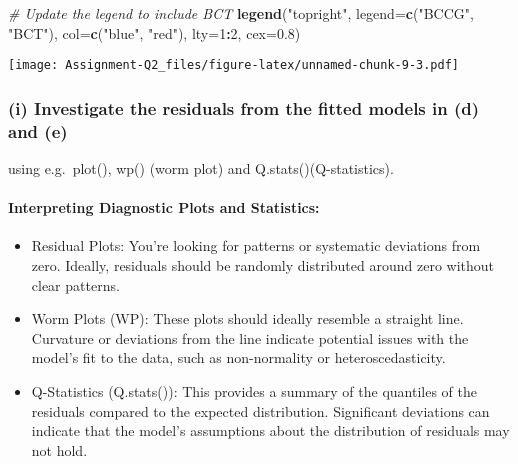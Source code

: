 \documentclass[
]{article}
\newenvironment{Shaded}{\begin{snugshade}}{\end{snugshade}}
\newcommand{\AttributeTok}[1]{\textcolor[rgb]{0.13,0.29,0.53}{#1}}
\newcommand{\CommentTok}[1]{\textcolor[rgb]{0.56,0.35,0.01}{\textit{#1}}}
\newcommand{\DecValTok}[1]{\textcolor[rgb]{0.00,0.00,0.81}{#1}}
\newcommand{\FloatTok}[1]{\textcolor[rgb]{0.00,0.00,0.81}{#1}}
\newcommand{\FunctionTok}[1]{\textcolor[rgb]{0.13,0.29,0.53}{\textbf{#1}}}
\newcommand{\NormalTok}[1]{#1}
\newcommand{\SpecialCharTok}[1]{\textcolor[rgb]{0.81,0.36,0.00}{\textbf{#1}}}
\newcommand{\StringTok}[1]{\textcolor[rgb]{0.31,0.60,0.02}{#1}}
\begin{document}
\begin{Shaded}
\begin{Highlighting}[]
\CommentTok{\# Update the legend to include BCT}
\FunctionTok{legend}\NormalTok{(}\StringTok{"topright"}\NormalTok{, }\AttributeTok{legend=}\FunctionTok{c}\NormalTok{(}\StringTok{"BCCG"}\NormalTok{, }\StringTok{"BCT"}\NormalTok{), }\AttributeTok{col=}\FunctionTok{c}\NormalTok{(}\StringTok{"blue"}\NormalTok{, }\StringTok{"red"}\NormalTok{), }\AttributeTok{lty=}\DecValTok{1}\SpecialCharTok{:}\DecValTok{2}\NormalTok{, }\AttributeTok{cex=}\FloatTok{0.8}\NormalTok{)}
\end{Highlighting}
\end{Shaded}

\texttt{[image: Assignment-Q2\_files/figure-latex/unnamed-chunk-9-3.pdf]}

\hypertarget{i-investigate-the-residuals-from-the-fitted-models-in-d-and-e}{%
\subsubsection{(i) Investigate the residuals from the fitted models in
(d) and
(e)}\label{i-investigate-the-residuals-from-the-fitted-models-in-d-and-e}}

using e.g.~plot(), wp() (worm plot) and Q.stats()(Q-statistics).

\hypertarget{interpreting-diagnostic-plots-and-statistics}{%
\paragraph{Interpreting Diagnostic Plots and
Statistics:}\label{interpreting-diagnostic-plots-and-statistics}}

\begin{itemize}
\item
  Residual Plots: You're looking for patterns or systematic deviations
  from zero. Ideally, residuals should be randomly distributed around
  zero without clear patterns.
\item
  Worm Plots (WP): These plots should ideally resemble a straight line.
  Curvature or deviations from the line indicate potential issues with
  the model's fit to the data, such as non-normality or
  heteroscedasticity.
\item
  Q-Statistics (Q.stats()): This provides a summary of the quantiles of
  the residuals compared to the expected distribution. Significant
  deviations can indicate that the model's assumptions about the
  distribution of residuals may not hold.
\end{itemize}
\end{document}
